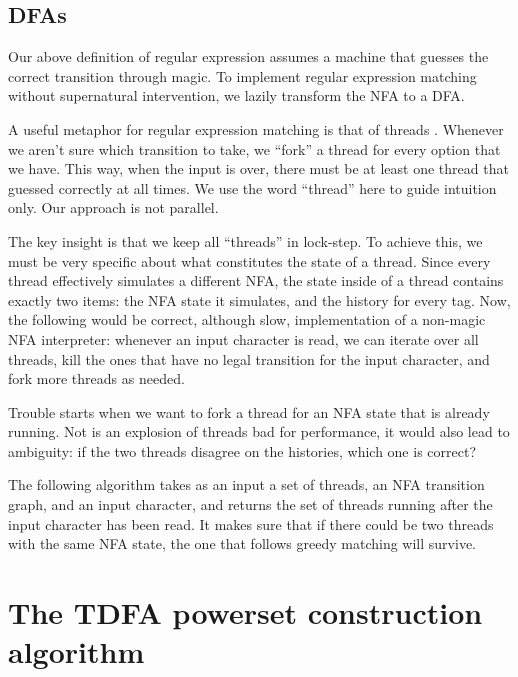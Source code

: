 \documentclass[english]{sigplanconf}
\theoremstyle{definition}
\begin{document}
\subsection{DFAs}

Our above definition of regular expression assumes a machine that
guesses the correct transition through magic. To implement regular
expression matching without supernatural intervention, we lazily transform
the NFA to a DFA. 

A useful metaphor for regular expression matching is that of threads
\cite{Cox2007}. Whenever we aren't sure which transition to take,
we ``fork'' a thread for every option that we have. This way, when
the input is over, there must be at least one thread that guessed
correctly at all times. We use the word ``thread'' here to guide
intuition only. Our approach is not parallel. 

The key insight is that we keep all ``threads'' in lock-step. To
achieve this, we must be very specific about what constitutes the
state of a thread. Since every thread effectively simulates a different
NFA, the state inside of a thread contains exactly two items: the
NFA state it simulates, and the history for every tag. Now, the following
would be correct, although slow, implementation of a non-magic NFA
interpreter: whenever an input character is read, we can iterate over
all threads, kill the ones that have no legal transition for the input
character, and fork more threads as needed.

Trouble starts when we want to fork a thread for an NFA state that
is already running. Not is an explosion of threads bad for performance,
it would also lead to ambiguity: if the two threads disagree on the
histories, which one is correct?

The following algorithm takes as an input a set of threads, an NFA
transition graph, and an input character, and returns the set of threads
running after the input character has been read. It makes sure that
if there could be two threads with the same NFA state, the one that
follows greedy matching will survive.


\section{The TDFA powerset construction algorithm\label{sec:The-TNFA-algorithm}}
\end{document}
